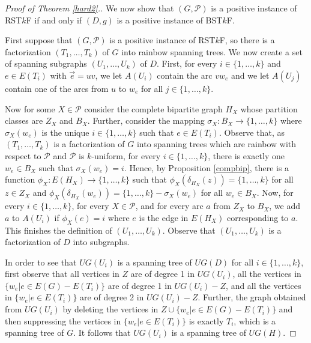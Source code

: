 \documentclass{article}
\begin{document}
\begin{proof}[Proof of Theorem \ref{hard2}.]
We now show that $(G,\mathcal{P})$ is a positive instance of RST$k$F if and only if $(D,g)$ is a positive instance of  BST$k$F.
\medskip

First suppose that $(G,\mathcal{P})$ is a positive instance of RST$k$F, so there is a factorization $(T_1,\ldots,T_k)$ of $G$ into rainbow spanning trees. We now create a set of spanning subgraphs $(U_1,\ldots,U_k)$ of $D$. %
First, for every $i \in \{1,\ldots,k\}$ and $e\in E(T_i)$ with $\vec{e}=uv$, we let $A(U_i)$ contain the arc $vw_e$ and we let $A(U_j)$ contain one of the arcs from $u$ to $w_e$ for all $j \in \{1,\ldots,k\}$.

Now for some $X \in \mathcal{P}$ consider the complete bipartite graph $H_X$ whose partition classes are $Z_X$ and $B_X$. Further, consider the mapping $\sigma_X:B_X\rightarrow \{1,\ldots,k\}$ where $\sigma_X(w_e)$ is the unique $i \in \{1,\ldots,k\}$ such that $e \in E(T_i)$. Observe that, as $(T_1,\ldots,T_k)$ is a factorization of $G$ into spanning trees which are rainbow with respect to $\mathcal{P}$ and $\mathcal{P}$ is $k$-uniform, for every $i \in \{1,\ldots,k\}$, there is exactly one $w_e \in B_X$ such that $\sigma_X(w_e)=i$. Hence, by Proposition \ref{compbip}, there is a function $\phi_X:E(H_X)\rightarrow \{1,\ldots,k\}$ such that $\phi_X(\delta_{H_X}(z))=\{1,\ldots,k\}$ for all $z \in Z_X$ and $\phi_X(\delta_{H_X}(w_e))=\{1,\ldots,k\}-\sigma_X(w_e)$ for all $w_e \in B_X$. Now, for every $i \in \{1,\ldots,k\}$, for every $X \in \mathcal{P}$, and for every arc $a$ from $Z_X$ to $B_X$, we add $a$ to $A(U_i)$ if $\phi_X(e)=i$ where $e$ is the edge in $E(H_X)$ corresponding to $a$. This finishes the definition of $(U_1,\ldots,U_k)$. Observe that $(U_1,\ldots,U_k)$ is a factorization of $D$ into subgraphs.

In order to see that $UG(U_i)$ is a spanning tree of $UG(D)$ for all $i \in \{1,\ldots,k\}$, first observe that all vertices in $Z$ are of degree 1 in $UG(U_i)$, all the vertices in $\{w_e|e \in E(G)-E(T_i)\}$ are of degree 1 in $UG(U_i)-Z$, and all the vertices in $\{w_e|e \in E(T_i)\}$ are of degree 2 in $UG(U_i)-Z$. Further, the graph obtained from $UG(U_i)$ by deleting the vertices in $Z \cup \{w_e|e \in E(G)-E(T_i)\}$ and then suppressing the vertices in $\{w_e|e \in E(T_i)\}$ is exactly $T_i$, which is a spanning tree of $G$. It follows that $UG(U_i)$ is a spanning tree of $UG(H)$.


\end{proof}
\end{document}

